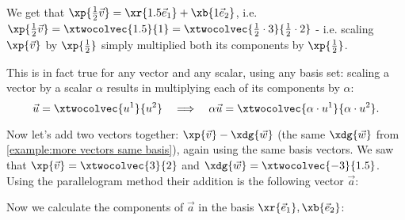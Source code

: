 We get that $\xp{\frac{1}{2}\vec{v}}=\xr{1.5\vec{e}_{1}}+\xb{1\vec{e}_{2}}$, i.e. $\xp{\frac{1}{2}\vec{v}}=\xtwocolvec{1.5}{1}=\xtwocolvec{\frac{1}{2}\cdot3}{\frac{1}{2}\cdot2}$ - i.e. scaling $\xp{\vec{v}}$ by $\xp{\frac{1}{2}}$ simply multiplied both its components by $\xp{\frac{1}{2}}$.

This is in fact true for any vector and any scalar, using any basis set: scaling a vector by a scalar $\alpha$ results in multiplying each of its components by $\alpha$:
\begin{equation}
  \vec{u} = \xtwocolvec{u^{1}}{u^{2}}\quad\Longrightarrow\quad \alpha\vec{u} = \xtwocolvec{\alpha\cdot u^{1}}{\alpha\cdot u^{2}}.
  \label{eq:column_representation_scaling}
\end{equation}

Now let's add two vectors together: $\xp{\vec{v}}-\xdg{\vec{w}}$ (the same $\xdg{\vec{w}}$ from \autoref{example:more vectors same basis}), again using the same basis vectors. We saw that $\xp{\vec{v}}=\xtwocolvec{3}{2}$ and $\xdg{\vec{w}}=\xtwocolvec{-3}{1.5}$. Using the parallelogram method their addition is the following vector $\vec{a}$:

\begin{center}
\end{center}

Now we calculate the components of $\vec{a}$ in the basis $\xr{\vec{e}_{1}},\xb{\vec{e}_{2}}$:

\begin{center}
\end{center}

